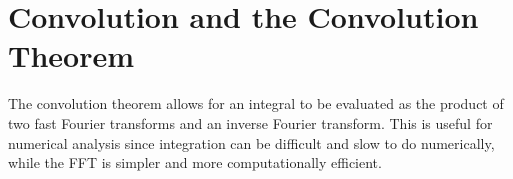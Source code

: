 %
%
%


            \section{Convolution and the Convolution Theorem}

            The convolution theorem allows for an integral to be evaluated as
            the product of two fast Fourier transforms and an inverse Fourier
            transform. This is useful for numerical analysis since integration
            can be difficult and slow to do numerically, while the FFT is
            simpler and more computationally efficient.


